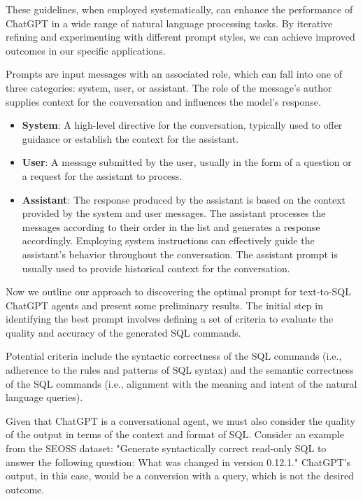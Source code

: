 These guidelines, when employed systematically, can enhance the performance of ChatGPT in a wide range of natural language processing tasks. By iterative refining and experimenting with different prompt styles, we can achieve improved outcomes in our specific applications.


Prompts are input messages with an associated role, which can fall into one of three categories: system, user, or assistant. The role of the message's author supplies context for the conversation and influences the model's response. \cite{openai2023gpt4}

\begin{itemize}
    \item \textbf{System}: A high-level directive for the conversation, typically used to offer guidance or establish the context for the assistant.
    \item \textbf{User}: A message submitted by the user, usually in the form of a question or a request for the assistant to process.
    \item \textbf{Assistant}: The response produced by the assistant is based on the context provided by the system and user messages. The assistant processes the messages according to their order in the list and generates a response accordingly. Employing system instructions can effectively guide the assistant's behavior throughout the conversation. The assistant prompt is usually used to provide historical context for the conversation. 
\end{itemize}

Now we outline our approach to discovering the optimal prompt for text-to-SQL ChatGPT agents and present some preliminary results.
The initial step in identifying the best prompt involves defining a set of criteria to evaluate the quality and accuracy of the generated SQL commands.

Potential criteria include the syntactic correctness of the SQL commands (i.e., adherence to the rules and patterns of SQL syntax) and the semantic correctness of the SQL commands (i.e., alignment with the meaning and intent of the natural language queries).

Given that ChatGPT is a conversational agent, we must also consider the quality of the output in terms of the context and format of SQL.
Consider an example from the SEOSS dataset: "Generate syntactically correct read-only SQL to answer the following question: What was changed in version 0.12.1." ChatGPT's output, in this case, would be a conversion with a query, which is not the desired outcome.

